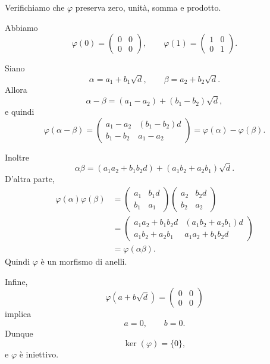 \documentclass[a4paper]{article}
\begin{document}
\begin{radioactive}
\begin{snippetsolution}{}
    Verifichiamo che \(\varphi\) preserva zero, unità, somma e prodotto.

    Abbiamo
    \[
        \varphi(0)
        =
        \begin{pmatrix}
            0 & 0 \\
            0 & 0
        \end{pmatrix},
        \qquad
        \varphi(1)
        =
        \begin{pmatrix}
            1 & 0 \\
            0 & 1
        \end{pmatrix}.
    \]

    Siano
    \[
        \alpha=a_1+b_1\sqrt{d},
        \qquad
        \beta=a_2+b_2\sqrt{d}.
    \]
    Allora
    \[
        \alpha-\beta
        =
        (a_1-a_2)+(b_1-b_2)\sqrt{d},
    \]
    e quindi
    \[
        \varphi(\alpha-\beta)
        =
        \begin{pmatrix}
            a_1-a_2 & (b_1-b_2)d \\
            b_1-b_2 & a_1-a_2
        \end{pmatrix}
        =
        \varphi(\alpha)-\varphi(\beta).
    \]

    Inoltre
    \[
        \alpha\beta
        =
        (a_1a_2+b_1b_2d)+(a_1b_2+a_2b_1)\sqrt{d}.
    \]
    D'altra parte,
    \begin{align*}
        \varphi(\alpha)\varphi(\beta)
        &=
        \begin{pmatrix}
            a_1 & b_1d \\
            b_1 & a_1
        \end{pmatrix}
        \begin{pmatrix}
            a_2 & b_2d \\
            b_2 & a_2
        \end{pmatrix} \\
        &=
        \begin{pmatrix}
            a_1a_2+b_1b_2d & (a_1b_2+a_2b_1)d \\
            a_1b_2+a_2b_1 & a_1a_2+b_1b_2d
        \end{pmatrix} \\
        &=
        \varphi(\alpha\beta).
    \end{align*}
    Quindi \(\varphi\) è un morfismo di anelli.

    Infine,
    \[
        \varphi(a+b\sqrt{d})
        =
        \begin{pmatrix}
            0 & 0 \\
            0 & 0
        \end{pmatrix}
    \]
    implica
    \[
        a=0,
        \qquad
        b=0.
    \]
    Dunque
    \[
        \ker(\varphi)=\{0\},
    \]
    e \(\varphi\) è iniettivo.


\end{snippetsolution}
\end{radioactive}
\end{document}
